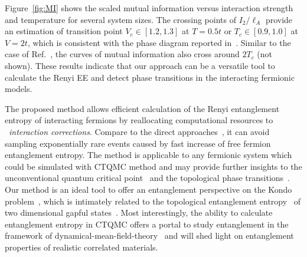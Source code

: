 \documentclass[twocolumn,english,prl,showpacs]{revtex4}
\begin{document}
Figure~\ref{fig:MI} shows the scaled mutual information versus interaction strength and temperature for several system sizes. The crossing points of $I_{2}/\ell_{A}$ provide an estimation of transition point $V_{c}\in[1.2, 1.3]$ at $T=0.5t$ or $T_{c}\in[0.9, 1.0]$ at $V=2t$, which is consistent with the phase diagram reported in~\cite{Gubernatis:1985wo}. Similar to the case of Ref.~\cite{Melko:2010jda, Iaconis:2013jz}, the curves of mutual information also cross around $2T_{c}$ (not shown). These results indicate that our approach can be a versatile tool to calculate the Renyi EE and detect phase transitions in the interacting fermionic models.  



%

The proposed method allows efficient calculation of the Renyi entanglement entropy of interacting fermions by reallocating computational resources to ~\emph{interaction corrections}. Compare to the direct approaches~\cite{Grover:2013cs, Broecker:2014ud}, it can avoid sampling exponentially rare events caused by fast increase of free fermion entanglement entropy. The method is applicable to any fermionic system which could be simulated with CTQMC method and may provide further insights to the unconventional quantum critical point~\cite{PhysRevX.3.031010, CTQMCpaper} and the topological phase transitions~\cite{Hohenadler:2011kk, Wang:2014vb, Anonymous:XiXakTeu}. Our method is an ideal tool to offer an entanglement perspective on the Kondo problem~\cite{Sorensen:2007eg,Sorensen:2007dn, PhysRevB.84.041107, PhysRevLett.109.066403}, which is intimately related to the topological entanglement entropy~\cite{Levin:2006ij, Kitaev:2006dn} of two dimensional gapful states~\cite{Fendley:2007gkc}. Most interestingly, the ability to calculate entanglement entropy in CTQMC offers a portal to study entanglement in the framework of dynamical-mean-field-theory~\cite{RevModPhys.68.13,Gull:2011jd} and will  shed light on entanglement properties of realistic correlated materials. %
\end{document}
